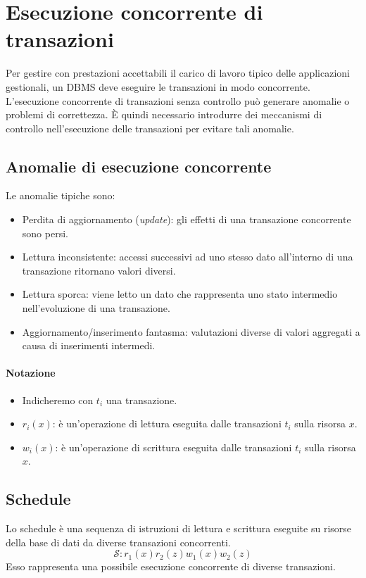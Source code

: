 \documentclass[oneside,a4paper,11pt]{book}
\theoremstyle{italicstyle}
\theoremstyle{normStyle}
\begin{document}
\chapter{Esecuzione concorrente di transazioni}
Per gestire con prestazioni accettabili il carico di lavoro tipico delle applicazioni 
gestionali, un DBMS deve eseguire le transazioni in modo concorrente.
L'esecuzione concorrente di transazioni senza controllo può generare anomalie 
o problemi di correttezza. È quindi necessario introdurre dei meccanismi di controllo 
nell'esecuzione delle transazioni per evitare tali anomalie.
\section{Anomalie di esecuzione concorrente}
Le anomalie tipiche sono:
\begin{itemize}
  \item Perdita di aggiornamento (\textit{update}): gli effetti di una transazione 
  concorrente sono persi.
  \item Lettura inconsistente: accessi successivi ad uno stesso dato all'interno 
  di una transazione ritornano valori diversi.
  \item Lettura sporca: viene letto un dato che rappresenta uno stato intermedio
  nell'evoluzione di una transazione.
  \item Aggiornamento/inserimento fantasma: valutazioni diverse di valori aggregati 
  a causa di inserimenti intermedi.
\end{itemize}

\subsubsection{Notazione}
\begin{itemize}
  \item Indicheremo con $t_i$ una transazione.
  \item $r_i(x)$: è un'operazione di lettura eseguita dalle transazioni 
  $t_i$ sulla risorsa $x$.
  \item $w_i(x)$: è un'operazione di scrittura eseguita dalle transazioni 
  $t_i$ sulla risorsa $x$.
\end{itemize}
\section{Schedule}
Lo schedule è una sequenza di istruzioni di lettura e scrittura eseguite su 
risorse della base di dati da diverse transazioni concorrenti.
\[
  \mathcal{S}:r_1(x)r_2(z)w_1(x)w_2(z)
\]
Esso rappresenta una possibile esecuzione concorrente di diverse transazioni.
\end{document}
